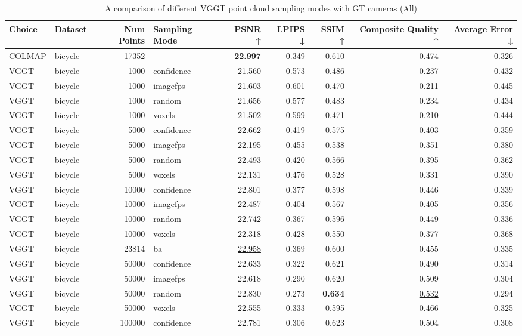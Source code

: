 \begin{table}[H]
\caption{A comparison of different VGGT point cloud sampling modes with GT cameras (All)}
\label{tab:03_sampling_mode_gt_cams_all}
\small
\begin{tabular}{llrlrrrrr}
\toprule
Choice & Dataset & Num Points & Sampling Mode & PSNR ↑ & LPIPS ↓ & SSIM ↑ & Composite Quality ↑ & Average Error ↓ \\
\midrule
COLMAP & bicycle & 17352 &  & \textbf{22.997} & 0.349 & 0.610 & 0.474 & 0.326 \\
VGGT & bicycle & 1000 & confidence & 21.560 & 0.573 & 0.486 & 0.237 & 0.432 \\
VGGT & bicycle & 1000 & imagefps & 21.603 & 0.601 & 0.470 & 0.211 & 0.445 \\
VGGT & bicycle & 1000 & random & 21.656 & 0.577 & 0.483 & 0.234 & 0.434 \\
VGGT & bicycle & 1000 & voxels & 21.502 & 0.599 & 0.471 & 0.210 & 0.444 \\
VGGT & bicycle & 5000 & confidence & 22.662 & 0.419 & 0.575 & 0.403 & 0.359 \\
VGGT & bicycle & 5000 & imagefps & 22.195 & 0.455 & 0.538 & 0.351 & 0.380 \\
VGGT & bicycle & 5000 & random & 22.493 & 0.420 & 0.566 & 0.395 & 0.362 \\
VGGT & bicycle & 5000 & voxels & 22.131 & 0.476 & 0.528 & 0.331 & 0.390 \\
VGGT & bicycle & 10000 & confidence & 22.801 & 0.377 & 0.598 & 0.446 & 0.339 \\
VGGT & bicycle & 10000 & imagefps & 22.487 & 0.404 & 0.567 & 0.405 & 0.356 \\
VGGT & bicycle & 10000 & random & 22.742 & 0.367 & 0.596 & 0.449 & 0.336 \\
VGGT & bicycle & 10000 & voxels & 22.318 & 0.428 & 0.550 & 0.377 & 0.368 \\
VGGT & bicycle & 23814 & ba & \underline{22.958} & 0.369 & 0.600 & 0.455 & 0.335 \\
VGGT & bicycle & 50000 & confidence & 22.633 & 0.322 & 0.621 & 0.490 & 0.314 \\
VGGT & bicycle & 50000 & imagefps & 22.618 & 0.290 & 0.620 & 0.509 & 0.304 \\
VGGT & bicycle & 50000 & random & 22.830 & 0.273 & \textbf{0.634} & \underline{0.532} & 0.294 \\
VGGT & bicycle & 50000 & voxels & 22.555 & 0.333 & 0.595 & 0.466 & 0.325 \\
VGGT & bicycle & 100000 & confidence & 22.781 & 0.306 & 0.623 & 0.504 & 0.308 \\

\end{tabular}
\end{table}
